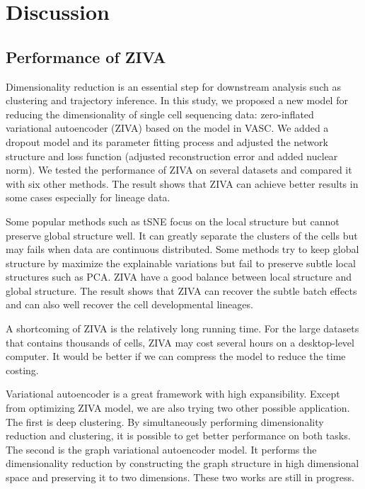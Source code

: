 \section{Discussion}
\subsection{Performance of ZIVA}
Dimensionality reduction is an essential step for downstream analysis such as clustering and trajectory inference. In this study, we proposed a new model for reducing the dimensionality of single cell sequencing data: zero-inflated variational autoencoder (ZIVA) based on the model in VASC. We added a dropout model and its parameter fitting process and adjusted the network structure and loss function (adjusted reconstruction error and added nuclear norm). We tested the performance of ZIVA on several datasets and compared it with six other methods. The result shows that ZIVA can achieve better results in some cases especially for lineage data. 

Some popular methods such as tSNE focus on the local structure but cannot preserve global structure well. It can greatly separate the clusters of the cells but may fails when data are continuous distributed. Some methods try to keep global structure by maximize the explainable variations but fail to preserve subtle local structures such as PCA. ZIVA have a good balance between local structure and global structure. The result shows that ZIVA can recover the subtle batch effects and can also well recover the cell developmental lineages.

A shortcoming of ZIVA is the relatively long running time. For the large datasets that contains thousands of cells, ZIVA may cost several hours on a desktop-level computer. It would be better if we can compress the model to reduce the time costing.

Variational autoencoder is a great framework with high expansibility. Except from optimizing ZIVA model, we are also trying two other possible application. The first is deep clustering. By simultaneously performing dimensionality reduction and clustering, it is possible to get better performance on both tasks. The second is the graph variational autoencoder model. It performs the dimensionality reduction by constructing the graph structure in high dimensional space and preserving it to two dimensions. These two works are still in progress.

